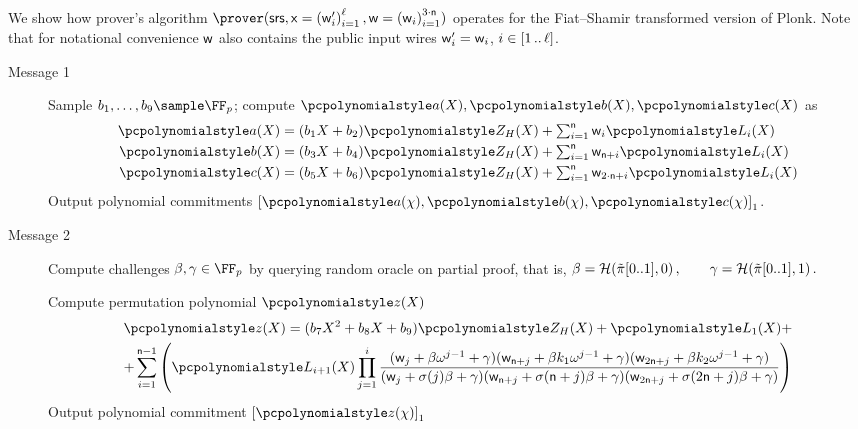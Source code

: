 We show how prover's algorithm
$\prover(\srs, \inp=\brak{\wit'_i}_{i = 1}^\instsize, \wit = \brak{\wit_i}_{i=1}^{3 \cdot \noofc})$ operates for
the Fiat--Shamir transformed version of Plonk. Note that for notational convenience $\mathsf{w}$ also contains the public input wires $\mathsf{w}'_i=\mathsf{w}_i$, $i\in [1 \, .. \, \ell]$.
\begin{description}
\item[Message 1] Sample $b_1, \ldots, b_9 \sample \FF_p$; compute
  $\p{a}(X), \p{b}(X), \p{c}(X)$ as
	\begin{align*}
		\p{a}(X) &= (b_1 X + b_2)\p{Z_H}(X) + \textstyle \sum_{i = 1}^{\noofc} \wit_i \lag_i(X) \\
		\p{b}(X) &= (b_3 X + b_4)\p{Z_H}(X) + \textstyle \sum_{i = 1}^{\noofc} \wit_{\noofc + i} \lag_i(X) \\
		\p{c}(X) &= (b_5 X + b_6)\p{Z_H}(X) + \textstyle \sum_{i = 1}^{\noofc} \wit_{2 \cdot \noofc + i} \lag_i(X) 
	\end{align*}
	Output polynomial commitments $\gone{\p{a}(\chi), \p{b}(\chi), \p{c}(\chi)}$.  
	
\item[Message 2] Compute challenges $\beta, \gamma \in \FF_p$ by querying random oracle
  on partial proof, that is,
	\(
		\beta = \mathcal{H}(\tilde{\pi}[0..1], 0)\,, \qquad \gamma = \mathcal{H}(\tilde{\pi}[0..1], 1)\,.
	\)
  
	Compute permutation polynomial $\p{z}(X)$
	\begin{multline*}
		\p{z}(X) = (b_7 X^2 + b_8 X + b_9)\p{Z_H}(X) + \lag_1(X) + \\
    + \sum_{i = 1}^{\noofc - 1} \left(\lag_{i + 1} (X) \prod_{j = 1}^{i} \frac{
        (\wit_j +\beta \omega^{j - 1} + \gamma)(\wit_{\noofc + j} + \beta k_1
        \omega^{j - 1} + \gamma)(\wit_{2 \noofc + j} +\beta k_2 \omega^{j- 1} +
        \gamma)} {(\wit_j+\sigma(j) \beta + \gamma)(\wit_{\noofc + j} + \sigma(\noofc
        + j)\beta + \gamma)(\wit_{2 \noofc + j} + \sigma(2 \noofc + j)\beta +
        \gamma)}\right)
	\end{multline*}
	Output polynomial commitment $\gone{\p{z}(\chi)}$
		

\end{description}
